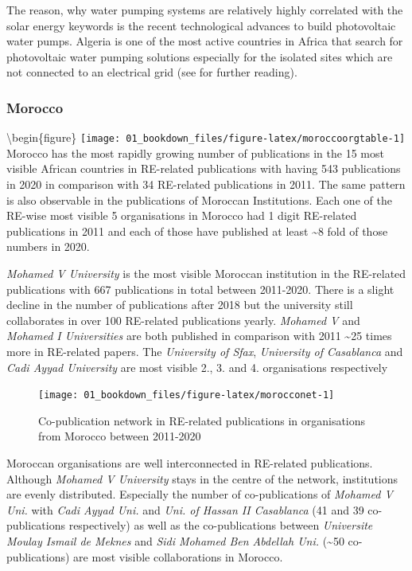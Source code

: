 \documentclass[
]{book}
\begin{document}
The reason, why water pumping systems are relatively highly correlated with the solar energy keywords is the recent technological advances to build photovoltaic water pumps. Algeria is one of the most active countries in Africa that search for photovoltaic water pumping solutions especially for the isolated sites which are not connected to an electrical grid (see \citet{benghanem2007} for further reading).

\hypertarget{morocco}{%
\subsubsection{Morocco}\label{morocco}}

\textbackslash begin\{figure\}
\texttt{[image: 01\_bookdown\_files/figure-latex/moroccoorgtable-1]}
Morocco has the most rapidly growing number of publications in the 15 most visible African countries in RE-related publications with having 543 publications in 2020 in comparison with 34 RE-related publications in 2011. The same pattern is also observable in the publications of Moroccan Institutions. Each one of the RE-wise most visible 5 organisations in Morocco had 1 digit RE-related publications in 2011 and each of those have published at least \textasciitilde8 fold of those numbers in 2020.

\emph{Mohamed V University} is the most visible Moroccan institution in the RE-related publications with 667 publications in total between 2011-2020. There is a slight decline in the number of publications after 2018 but the university still collaborates in over 100 RE-related publications yearly. \emph{Mohamed V} and \emph{Mohamed I Universities} are both published in comparison with 2011 \textasciitilde25 times more in RE-related papers. The \emph{University of Sfax}, \emph{University of Casablanca} and \emph{Cadi Ayyad University} are most visible 2., 3. and 4. organisations respectively

\begin{figure}
\texttt{[image: 01\_bookdown\_files/figure-latex/morocconet-1]} \caption{Co-publication network in RE-related publications in organisations from Morocco between 2011-2020}\label{fig:morocconet}
\end{figure}

Moroccan organisations are well interconnected in RE-related publications. Although \emph{Mohamed V University} stays in the centre of the network, institutions are evenly distributed. Especially the number of co-publications of \emph{Mohamed V Uni.} with \emph{Cadi Ayyad Uni.} and \emph{Uni. of Hassan II Casablanca} (41 and 39 co-publications respectively) as well as the co-publications between \emph{Universite Moulay Ismail de Meknes} and \emph{Sidi Mohamed Ben Abdellah Uni.} (\textasciitilde50 co-publications) are most visible collaborations in Morocco.
\end{document}
